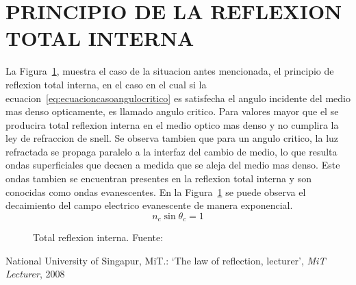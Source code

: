 \documentclass[letterpaper, 10 pt, conference]{ieeeconf}  %
\begin{document}
\section{PRINCIPIO DE LA REFLEXION TOTAL INTERNA}
La Figura~\ref{fig:TIR}, muestra el caso de la situacion antes mencionada, el principio de reflexion total interna, en el caso en el cual si la ecuacion~\eqref{eq:ecuacioncasoangulocritico} es satisfecha el angulo incidente del medio mas denso opticamente, es llamado angulo critico. Para valores mayor que el se producira total reflexion interna en el medio optico mas denso y no cumplira la ley de refraccion de snell. Se observa tambien que para un angulo critico, la luz refractada se propaga paralelo a la interfaz del cambio de medio, lo que resulta ondas superficiales que decaen a medida que se aleja del medio mas denso. Este ondas tambien se encuentran presentes en la reflexion total interna y son conocidas como ondas evanescentes. En la Figura~\ref{fig:TIR} se puede observa el decaimiento del campo electrico evanescente de manera exponencial.
\begin{equation}
\label{eq:ecuacioncasoangulocritico}
{
{n_c}\sin {\theta _c} = 1
}
\end{equation}


\begin{figure}[ht!]
\caption{Total reflexion interna. Fuente:~\cite{1}
}\label{fig:TIR}
\end{figure}

\begin{thebibliography}{}

National University of Singapur, MiT.: `The law of reflection, lecturer',
\textit{MiT Lecturer}, 2008

\end{thebibliography}
\end{document}

